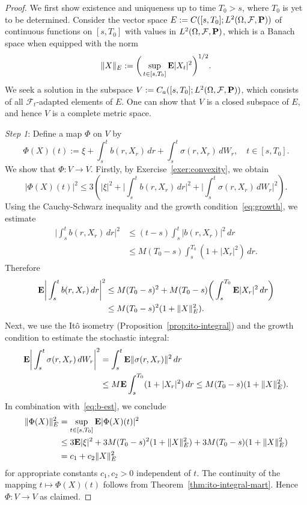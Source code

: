 \begin{proof}
	    We first show existence and uniqueness up to time $T_0>s$, where $T_0$ is yet to be determined. Consider the vector space $E:=C([s,T_0];L^2(\Omega,\mathcal{F},\mathbf{P}))$ of continuous functions on $[s,T_0]$ with values in $L^2(\Omega,\mathcal{F},\mathbf{P})$, which is a Banach space when equipped with the norm
	\begin{equation*}
		\|X\|_E := \bigg(\sup_{t\in [s,T_0]}\mathbf{E}|X_t|^2\bigg)^{1/2}.
	\end{equation*}
	We seek a solution in the subspace $V:=C_a([s,T_0];L^2(\Omega,\mathcal{F},\mathbf{P}))$, which consists of all $\mathcal{F}_t$-adapted elements of $E$. One can show that $V$ is a closed subspace of $E$, and hence $V$ is a complete metric space.
	
	\emph{Step 1}: Define a map $\Phi$ on $V$ by
	\begin{equation}
		\Phi(X)(t):= \xi + \int_s^t b(r,X_r)\,dr + \int_s^t \sigma(r,X_r)\,dW_r, \quad t\in [s,T_0].
	\end{equation}
	We show that $\Phi:V\to V$. Firstly, by Exercise~\ref{exer:convexity}, we obtain
	\begin{equation*}
		|\Phi(X)(t)|^2 \le 3\left(|\xi|^2 + \bigg|\int_s^t b(r,X_r)\,dr\bigg|^2 + \bigg|\int_s^t \sigma(r,X_r)\,dW_r\bigg|^2\right).
	\end{equation*}
	Using the Cauchy-Schwarz inequality and the growth condition~\eqref{eq:growth}, we estimate
	\begin{align*}
		\bigg|\int_s^t b(r,X_r)\,dr\bigg|^2 &\le (t-s)\int_s^t |b(r,X_r)|^2\,dr \\
		&\le M(T_0-s)\int_s^{T_0}(1+|X_r|^2)\,dr.
	\end{align*}
	Therefore
	\begin{align}
		\label{eq:b-est}
		\mathbf{E}\bigg|\int_s^t b(r,X_r)\,dr\bigg|^2 &\le M(T_0-s)^2 + M(T_0-s)\bigg(\int_s^{T_0}\mathbf{E}|X_r|^2\,dr\bigg) \nonumber\\
		&\le M(T_0-s)^2(1+\|X\|^2_E).
	\end{align}
	Next, we use the It\^{o} isometry (Proposition~\ref{prop:ito-integral}) and the growth condition to estimate the stochastic integral:
	\begin{align*}
		\mathbf{E}\bigg|\int_s^t \sigma(r,X_r)\,dW_r\bigg|^2 &= \int_s^t \mathbf{E}\|\sigma(r,X_r)\|^2\,dr \\
		&\le M \mathbf{E}\int_s^{T_0}(1+|X_r|^2)\,dr \le M(T_0-s)(1+\|X\|^2_E).
	\end{align*}
	In combination with~\eqref{eq:b-est}, we conclude
	\begin{align*}
		\|\Phi(X)\|^2_E &= \sup_{t\in[s,T_0]}\mathbf{E}|\Phi(X)(t)|^2 \\
		&\le 3\mathbf{E}|\xi|^2 + 3M(T_0-s)^2(1+\|X\|^2_E) + 3M(T_0-s)(1+\|X\|^2_E) \\
		&= c_1 + c_2\|X\|^2_E
	\end{align*}
	for appropriate constants $c_1,c_2>0$ independent of $t$. The continuity of the mapping $t\mapsto\Phi(X)(t)$ follows from Theorem~\ref{thm:ito-integral-mart}. Hence $\Phi:V\to V$ as claimed.
	

\end{proof}
